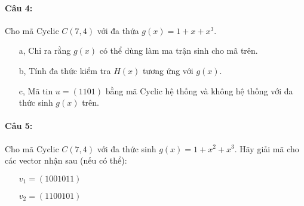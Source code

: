 \documentclass[paper=a4, fontsize=11pt]{scrartcl}
\numberwithin{equation}{section}		%
\numberwithin{figure}{section}			%
\numberwithin{table}{section}				%
\begin{document}
	\paragraph{Câu 4:} Cho mã Cyclic $C(7,4)$ với đa thứa $g(x)= 1+ x + x^3$.
	\begin{itemize}
		\item[a,] Chỉ ra rằng $g(x)$ có thể dùng làm ma trận sinh cho mã trên.
		\item[b,] Tính đa thức kiểm tra $H(x)$ tương ứng với $g(x)$. 
		\item[c,] Mã tin $u= (1101)$ bằng mã Cyclic hệ thống và không hệ thống với đa thức sinh $g(x)$ trên.
	\end{itemize}
	
	\paragraph{Câu 5:} Cho mã Cyclic $C(7,4)$ với đa thức sinh $g(x)= 1+ x^2 + x^3$. Hãy giải mã cho các vector nhận sau (nếu có thể):
	
	\begin{itemize}
		\item[] $v_1= (1001011)$
		\item[] $v_2= (1100101)$
	\end{itemize}
	
\end{document}
